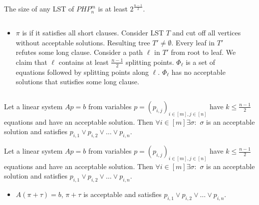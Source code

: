 {
\myth The size of any LST of $PHP^m_n$ is at least $2^{\frac{n-1}{2}}$.

\dok
\begin{columns}
\begin{column}{8.5cm}
\begin{itemize}
\item $\pi$ is  if it satisfies all short clauses.
\pitem Consider LST $T$ and cut off all vertices without acceptable solutions. Resulting tree $T'\neq \emptyset$.
\pitem Every leaf in $T'$ refutes some long clause.
\pitem Consider a path $\ell$ in $T'$ from root to leaf. We claim that $\ell$ contains at least $\frac{n-1}{2}$ splitting 
points.
\pitem $\Phi_\ell$ is a set of equations followed by splitting points along $\ell$. $\Phi_\ell$ has no acceptable solutions that sutisfies some long clause.
\end{itemize}
\end{column}
\begin{column}{2cm}
\end{column}
\end{columns}
\pause \mylem Let a linear system $Ap = b$ from variables
    $p = (p_{i, j})_{i \in [m], j \in [n]}$ have  $k\le \frac{n-1}{2}$
    equations and have an acceptable solution. Then  $\forall i\in [m] \exists \sigma:$ 
    $\sigma$ is an acceptable solution and satisfies $p_{i, 1} \lor
    p_{i, 2} \lor \dots \lor p_{i,n}$.
}

{
\mylem Let a linear system $Ap = b$ from variables
    $p = (p_{i, j})_{i \in [m], j \in [n]}$ have $k\le \frac{n-1}{2}$
    equations and have an acceptable solution. Then  $\forall i\in [m] \exists \sigma:$ 
    $\sigma$ is an acceptable solution and satisfies $p_{i, 1} \lor
    p_{i, 2} \lor \dots \lor p_{i,n}$.

\begin{itemize}
\pitem $1\to 0$ can't violate the acceptability.
\pitem Let $\pi$ be acceptable solution with the minimal number of 1's. 
\pitem $\pi$ contains at most $k$ ones.
\begin{itemize}
\pitem Variables with value $1$ in $\pi$: $p_{j_1}, p_{j_2}, \dots, p_{j_{k + 1}}$
\item $\exists \tau\neq 0: A\tau=0$ and support of $\tau$ is in $p_{j_1}, p_{j_2}, \dots, p_{j_{k + 1}}$.
\item $A(\pi+\tau)=b$, $\pi+\tau$ is acceptable.
\end{itemize}
\pitem $\pi$ has $k + 1$ empty holes with numbers $\ell_1, \ell_2, \dots, \ell_{k + 1}$
\pitem $\exists \tau\neq 0: A\tau=0$ and support of $\tau$ is in $p_{i,\ell_1}, p_{i,\ell_2}, \dots, p_{i,\ell_{k + 1}}$.
\item $A(\pi+\tau)=b$, $\pi+\tau$ is acceptable and satisfies $p_{i, 1} \lor p_{i, 2} \lor \dots \lor p_{i,n}$.
\end{itemize}
}

